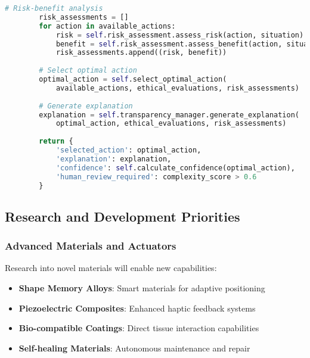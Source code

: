 \begin{lstlisting}[language=Python, caption={Next-Generation AI Architecture}, label={lst:nextgen-ai}]
        # Risk-benefit analysis
        risk_assessments = []
        for action in available_actions:
            risk = self.risk_assessment.assess_risk(action, situation)
            benefit = self.risk_assessment.assess_benefit(action, situation)
            risk_assessments.append((risk, benefit))
        
        # Select optimal action
        optimal_action = self.select_optimal_action(
            available_actions, ethical_evaluations, risk_assessments)
        
        # Generate explanation
        explanation = self.transparency_manager.generate_explanation(
            optimal_action, ethical_evaluations, risk_assessments)
        
        return {
            'selected_action': optimal_action,
            'explanation': explanation,
            'confidence': self.calculate_confidence(optimal_action),
            'human_review_required': complexity_score > 0.6
        }
\end{lstlisting}

\subsection{Research and Development Priorities}

\subsubsection{Advanced Materials and Actuators}
Research into novel materials will enable new capabilities:

\begin{itemize}
    \item \textbf{Shape Memory Alloys}: Smart materials for adaptive positioning
    \item \textbf{Piezoelectric Composites}: Enhanced haptic feedback systems
    \item \textbf{Bio-compatible Coatings}: Direct tissue interaction capabilities
    \item \textbf{Self-healing Materials}: Autonomous maintenance and repair
\end{itemize}


